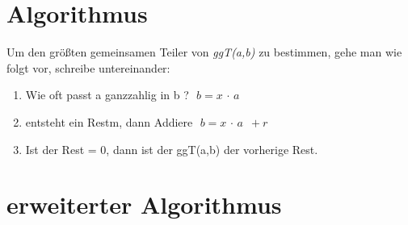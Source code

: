 \documentclass{scrreprt}
\theoremstyle{remark}
\begin{document}
\section{Algorithmus}
Um den größten gemeinsamen Teiler von \textit{ggT(a,b)} zu bestimmen, gehe man wie folgt vor, schreibe untereinander:
\begin{enumerate}
  \item Wie oft passt a ganzzahlig in b ? \rightarrow \,\,$\!b = x\,\cdot\,a$ 
  \item entsteht ein Restm, dann Addiere \rightarrow \,\,$\!b = x\,\cdot\, a\,\,\,+ r$
  \item Ist der Rest = 0, dann ist der ggT(a,b) der vorherige Rest. 
\end{enumerate}
\section{erweiterter Algorithmus}
\end{document}
